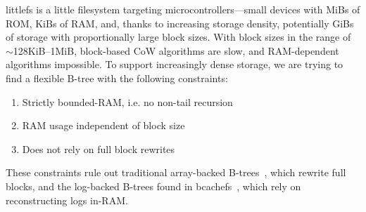 \documentclass[letterpaper,twocolumn,10pt]{article}
\def\lfs+{littlefs}
\begin{document}
\lfs+ is a little filesystem targeting microcontrollers---small devices with
MiBs of ROM, KiBs of RAM, and, thanks to
increasing storage density, potentially GiBs of storage with
proportionally large block sizes.
With block sizes in the range of {$\sim$}128KiB--1MiB,
block-based CoW algorithms are slow, and
RAM-dependent algorithms impossible.
To support increasingly dense storage, we are trying to find a flexible
B-tree with the following constraints:
\begin{enumerate}
\item Strictly bounded-RAM, i.e. no non-tail recursion
\item RAM usage independent of block size
\item Does not rely on full block rewrites
\end{enumerate}
These constraints rule out traditional array-backed
B-trees~\cite{ubiquitous-btree}, which rewrite full blocks,
and
the log-backed B-trees found in bcachefs~\cite{bcachefs}, which rely on
reconstructing logs in-RAM.
\end{document}
